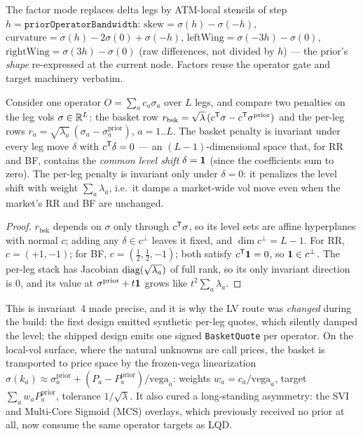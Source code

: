 \documentclass[11pt]{article}
\begin{document}
\begin{definition}
\label{def:factors}
The factor mode replaces delta legs by ATM-local stencils of step
$h=\texttt{priorOperatorBandwidth}$:
$\text{skew}=\sigma(h)-\sigma(-h)$,
$\text{curvature}=\sigma(h)-2\sigma(0)+\sigma(-h)$,
$\text{leftWing}=\sigma(-3h)-\sigma(0)$,
$\text{rightWing}=\sigma(3h)-\sigma(0)$ (raw differences, not divided by
$h$) --- the prior's \emph{shape} re-expressed at the current node. Factors
reuse the operator gate and target machinery verbatim.
\end{definition}

\begin{proposition}
\label{prop:nullspace}
Consider one operator $O=\sum_ac_a\sigma_a$ over $L$ legs, and compare two
penalties on the leg vols $\sigma\in\mathbb{R}^L$:
the basket row
$r_{\text{bsk}}=\sqrt\lambda\,(c^{\mathsf{T}}\sigma-c^{\mathsf{T}}\sigma^{\text{prior}})$ and the
per-leg rows
$r_a=\sqrt{\lambda_a}\,(\sigma_a-\sigma_a^{\text{prior}})$, $a=1..L$. The
basket penalty is invariant under every leg move $\delta$ with
$c^{\mathsf{T}}\delta=0$ --- an $(L{-}1)$-dimensional space that, for RR and BF,
contains the \emph{common level shift} $\delta=\mathbf{1}$ (since the coefficients
sum to zero). The per-leg penalty is invariant only under $\delta=0$: it
penalizes the level shift with weight $\sum_a\lambda_a$, i.e.\ it damps a
market-wide vol move even when the market's RR and BF are unchanged.
\end{proposition}

\begin{proof}
$r_{\text{bsk}}$ depends on $\sigma$ only through $c^{\mathsf{T}}\sigma$, so its level
sets are affine hyperplanes with normal $c$; adding any
$\delta\in c^\perp$ leaves it fixed, and $\dim c^\perp=L-1$. For RR,
$c=(+1,-1)$; for BF, $c=(\tfrac12,\tfrac12,-1)$; both satisfy $c^{\mathsf{T}}\mathbf{1}=0$, so
$\mathbf{1}\in c^\perp$. The per-leg stack has Jacobian
$\operatorname{diag}(\sqrt{\lambda_a})$ of full rank, so its only invariant direction is
$0$, and its value at $\sigma^{\text{prior}}+t\mathbf{1}$ grows like
$t^2\sum_a\lambda_a$.
\end{proof}

This is invariant~4 made precise, and it is why the LV route was
\emph{changed} during the build: the first design emitted synthetic per-leg
quotes, which silently damped the level; the shipped design emits one signed
\texttt{BasketQuote} per operator. On the local-vol surface, where the
natural unknowns are call prices, the basket is transported to price space by
the frozen-vega linearization
$\sigma(k_a)\approx\sigma^{\text{prior}}_a+(P_a-P^{\text{prior}}_a)/\text{vega}_a$:
weights $w_a=c_a/\text{vega}_a$, target $\sum_aw_aP^{\text{prior}}_a$,
tolerance $1/\sqrt\lambda$. It also cured a long-standing asymmetry: the SVI
and Multi-Core Sigmoid (MCS) overlays, which previously received no prior at
all, now consume the same operator targets as LQD.
\end{document}
